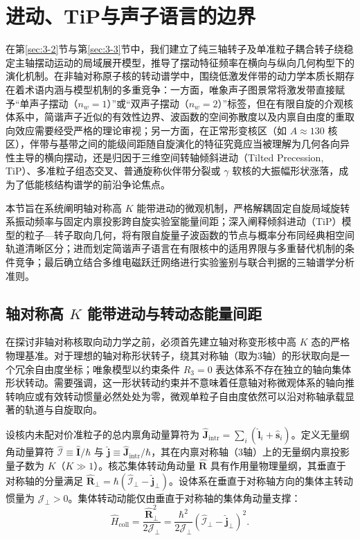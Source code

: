 \section{进动、TiP与声子语言的边界}\label{sec:3-4}

在第\ref{sec:3-2}节与第\ref{sec:3-3}节中，我们建立了纯三轴转子及单准粒子耦合转子绕稳定主轴摆动运动的局域展开模型，推导了摆动特征频率在横向与纵向几何构型下的演化机制。在非轴对称原子核的转动谱学中，围绕低激发伴带的动力学本质长期存在着术语内涵与模型机制的多重竞争：一方面，唯象声子图景常将激发带直接赋予“单声子摆动（$n_w=1$）”或“双声子摆动（$n_w=2$）”标签，但在有限自旋的介观核体系中，简谐声子近似的有效性边界、波函数的空间弥散度以及内禀自由度的重取向效应需要经受严格的理论审视；另一方面，在正常形变核区（如 $A \approx 130$ 核区），伴带与基带之间的能级间距随自旋演化的特征究竟应当被理解为几何各向异性主导的横向摆动，还是归因于三维空间转轴倾斜进动（Tilted Precession, TiP）、多准粒子组态交叉、普通旋称伙伴带分裂或 $\gamma$ 软核的大振幅形状涨落，成为了低能核结构谱学的前沿争论焦点。

本节旨在系统阐明轴对称高 $K$ 能带进动的微观机制，严格解耦固定自旋局域旋转系振动频率与固定内禀投影跨自旋实验室能量间距；深入阐释倾斜进动（TiP）模型的粒子—转子取向几何，将有限自旋量子波函数的节点与概率分布同经典相空间轨道清晰区分；进而划定简谐声子语言在有限核中的适用界限与多重替代机制的条件竞争；最后确立结合多维电磁跃迁网络进行实验鉴别与联合判据的三轴谱学分析准则。

\subsection{轴对称高 $K$ 能带进动与转动态能量间距}\label{sec:3-4-1}

在探讨非轴对称核取向动力学之前，必须首先建立轴对称变形核中高 $K$ 态的严格物理基准。对于理想的轴对称形状转子，绕其对称轴（取为3轴）的形状取向是一个冗余自由度坐标；唯象模型以约束条件 $R_3 = 0$ 表达体系不存在独立的轴向集体形状转动。需要强调，这一形状转动约束并不意味着任意轴对称微观体系的轴向推转响应或有效转动惯量必然处处为零，微观单粒子自由度依然可以沿对称轴承载显著的轨道与自旋取向。

设核内未配对价准粒子的总内禀角动量算符为 $\hat{\mathbf{J}}_{\text{intr}} = \sum_i (\hat{\mathbf{l}}_i + \hat{\mathbf{s}}_i)$。定义无量纲角动量算符 $\hat{\boldsymbol{\mathcal{I}}} \equiv \hat{\mathbf{I}}/\hbar$ 与 $\hat{\mathbf{j}} \equiv \hat{\mathbf{J}}_{\text{intr}}/\hbar$，其在内禀对称轴（3轴）上的无量纲内禀投影量子数为 $K$（$K \gg 1$）。核芯集体转动角动量 $\hat{\mathbf{R}}$ 具有作用量物理量纲，其垂直于对称轴的分量满足 $\hat{\mathbf{R}}_\perp = \hbar (\hat{\boldsymbol{\mathcal{I}}}_\perp - \hat{\mathbf{j}}_\perp)$。设体系在垂直于对称轴方向的集体主转动惯量为 $\mathcal{J}_\perp > 0$。集体转动动能仅由垂直于对称轴的集体角动量支撑：
\begin{equation}\label{eq:3-4-high-K-H}
\hat{H}_{\text{coll}} = \frac{\hat{\mathbf{R}}_\perp^2}{2\mathcal{J}_\perp} = \frac{\hbar^2}{2\mathcal{J}_\perp} \left( \hat{\boldsymbol{\mathcal{I}}}_\perp - \hat{\mathbf{j}}_\perp \right)^2.
\end{equation}

